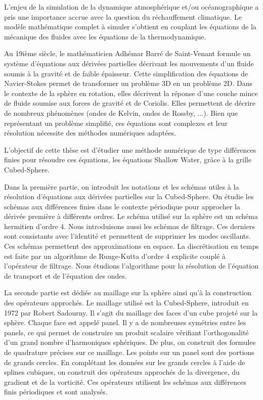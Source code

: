  \begin{FrenchAbstract}
L'enjeu de la simulation de la dynamique atmosphérique et/ou océanographique a pris une importance accrue avec la question du réchauffement climatique.
Le modèle mathématique complet à simuler s'obtient en couplant les équations de la mécanique des fluides avec les équations de la thermodynamique.

Au 19ième siècle, le mathématicien Adhémar Barré de Saint-Venant formule un système d'équations aux dérivées partielles décrivant les mouvements d'un fluide soumis à la gravité et de faible épaisseur. Cette simplification des équations de Navier-Stokes permet de transformer un problème 3D en un problème 2D. Dans le contexte de la sphère en rotation, elles décrivent la réponse d'une couche mince de fluide soumise aux forces de gravité et de Coriolis. Elles permettent de décrire de nombreux phénomènes (ondes de Kelvin, ondes de Rossby, ...). Bien que représentant un problème simplifié, ces équations sont complexes et leur résolution nécessite des méthodes numériques adaptées.

L'objectif de cette thèse est d'étudier une méthode numérique de type différences finies pour résoudre ces équations, les équations Shallow Water, grâce à la grille Cubed-Sphere.

Dans la première partie, on introduit les notations et les schémas utiles à la résolution d'équations aux dérivées partielles sur la Cubed-Sphere. On étudie les schémas aux différences finies dans le contexte périodique pour approcher la dérivée première à différents ordres. Le schéma utilisé sur la sphère est un schéma hermitien d'ordre 4. Nous introduisons aussi les schémas de filtrage. Ces derniers sont consistants avec l'identité et permettent de supprimer les modes oscillants. Ces schémas permettent des approximations en espace. La discrétisation en temps est faite par un algorithme de Runge-Kutta d'ordre 4 explicite couplé à l'opérateur de filtrage. Nous étudions l'algorithme pour la résolution de l'équation de transport et de l'équation des ondes. 

La seconde partie est dédiée au maillage sur la sphère ainsi qu'à la construction des opérateurs approchés. Le maillage utilisé est la Cubed-Sphere, introduit en 1972 par Robert Sadourny. Il s'agit du maillage des faces d'un cube projeté sur la sphère. Chaque face est appelé panel. Il y a de nombreuses symétries entre les panels, ce qui permet de construire un produit scalaire vérifiant l'orthogonalité d'un grand nombre d'harmoniques sphériques. De plus, on construit des formules de quadrature précises sur ce maillage. Les points sur un panel sont des portions de grands cercles. En complétant les données sur les grands cercles à l'aide de splines cubiques, on construit des opérateurs approchés de la divergence, du gradient et de la vorticité. Ces opérateurs utilisent les schémas aux différences finis périodiques et sont analysés.


\end{FrenchAbstract}
